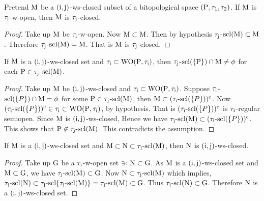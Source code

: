 \begin{thm}\label{thm8.2.14}
Pretend $\mathrm{M}$ be a $(\mathrm{i}, \mathrm{j})$-ws-closed subset of a bitopological space $(\mathrm{P}, \tau_1, \tau_2 )$. If $\mathrm{M}$ is $\tau_{\mathrm{i}}$-w-open, then $\mathrm{M}$ is $\tau_{\mathrm{j}}$-closed.
\end{thm}

\begin{proof}
Take up $\mathrm{M}$ be $\tau_{\mathrm{i}}$-w-open. Now $\mathrm{M}\subset \mathrm{M}$. Then by hypothesis $\tau_{\mathrm{j}}$-$\mathrm{scl}(\mathrm{M}) \subset \mathrm{M}$. Therefore $\tau_{\mathrm{j}}$-$\mathrm{scl}(\mathrm{M}) = \mathrm{M}$. That is $\mathrm{M}$ is $\tau_{\mathrm{j}}$-closed.
\end{proof}

\begin{thm}\label{thm8.2.15}
If $\mathrm{M}$ is a $(\mathrm{i}, \mathrm{j})$-ws-closed set and $\tau_{\mathrm{i}} \subset \mathrm{WO}(\mathrm{P}, \tau_{\mathrm{i}} )$, then $\tau_{\mathrm{j}}$-$\mathrm{scl}(\{\mathrm{P}\}) \cap \mathrm{M} \neq \phi$ for each $\mathrm{P} \in \tau_{\mathrm{j}}$-$\mathrm{scl}(\mathrm{M})$.
\end{thm}

\begin{proof}
Take up $\mathrm{M}$ be $(\mathrm{i}, \mathrm{j})$-ws-closed and $\tau_{\mathrm{i}} \subset \mathrm{WO}(\mathrm{P}, \tau_{\mathrm{i}} )$. Suppose $\tau_{\mathrm{i}}$-$\mathrm{scl}(\{P\}) \cap \mathrm{M} = \phi$ for some $\mathrm{P} \in \tau_{\mathrm{j}}$-$\mathrm{scl}(\mathrm{M})$, then $\mathrm{M} \subset (\tau_{\mathrm{i}}\text{-scl}(\{P\}))^{\text{c}}$. Now $(\tau_{\mathrm{i}}\text{-scl}(\{P\}))^{\text{c}} \in\tau_{\mathrm{i}} \subset \mathrm{WO}(\mathrm{P}, \tau_{\mathrm{i}} )$, by hypothesis. That is $(\tau_{\mathrm{i}}\text{-scl}(\{P\}))^{\text{c}}$ is $\tau_{\mathrm{i}}$-regular semiopen. Since $\mathrm{M}$ is $(\mathrm{i}, \mathrm{j})$-ws-closed, Hence we have $\tau_{\mathrm{j}}\text{-scl}(\mathrm{M}) \subset (\tau_{\mathrm{i}}\text{-scl}(\{P\}))^{\text{c}}$. This shows that $\mathrm{P} \not\in \tau_{\mathrm{j}}\text{-scl}(\mathrm{M})$. This contradicts the assumption.
\end{proof}

\begin{thm}\label{thm8.2.16}
If $\mathrm{M}$ is a $(\mathrm{i}, \mathrm{j})$-ws-closed set and $\mathrm{M} \subset \mathrm{N} \subset \tau_{\mathrm{j}}\text{-scl}(\mathrm{M})$, then $\mathrm{N}$ is $(\mathrm{i}, \mathrm{j})$-ws-closed.
\end{thm}

\begin{proof}
Take up $\mathrm{G}$ be a $\tau_{\mathrm{i}}$-w-open set $\ni: \mathrm{N} \subset \mathrm{G}$. As $\mathrm{M}$ is a $(\mathrm{i}, \mathrm{j})$-ws-closed set and $\mathrm{M} \subset \mathrm{G}$, we have $\tau_{\mathrm{j}}\text{-scl}(\mathrm{M}) \subset \mathrm{G}$. Now $\mathrm{N} \subset \tau_{\mathrm{j}}\text{-scl}(\mathrm{M})$ which implies, $\tau_{\mathrm{j}}\text{-scl}(\mathrm{N}) \subset \tau_{\mathrm{j}}\text{-scl}\{\tau_{\mathrm{j}}\text{-scl}(\mathrm{M})\}= \tau_{\mathrm{j}}\text{-scl}(\mathrm{M}) \subset \mathrm{G}$. Thus $\tau_{\mathrm{j}}\text{-scl}(\mathrm{N}) \subset \mathrm{G}$. Therefore $\mathrm{N}$ is a $(\mathrm{i}, \mathrm{j})$-ws-closed set.
\end{proof}

